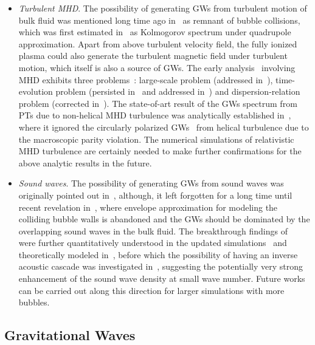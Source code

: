 \documentclass[a4paper,11pt]{article}
\begin{document}
\begin{itemize}
  \item \textit{Turbulent MHD}. The possibility of generating GWs from turbulent motion of bulk fluid was mentioned long time ago in~\cite{Witten:1984rs} as remnant of bubble collisions, which was first estimated in~\cite{Kamionkowski:1993fg} as Kolmogorov spectrum under quadrupole approximation. Apart from above turbulent velocity field, the fully ionized plasma could also generate the turbulent magnetic field under turbulent motion, which itself is also a source of GWs. The early analysis~\cite{Kosowsky:2001xp,Dolgov:2002ra} involving MHD exhibits three problems~\cite{Binetruy:2012ze}: large-scale problem (addressed in~\cite{Caprini:2006jb,Gogoberidze:2007an}), time-evolution problem (persisted in~\cite{Gogoberidze:2007an} and addressed in~\cite{Caprini:2006jb}) and dispersion-relation problem (corrected in~\cite{Caprini:2006jb,Gogoberidze:2007an}). The state-of-art result of the GWs spectrum from PTs due to non-helical MHD turbulence was analytically established in~\cite{Caprini:2009yp}, where it ignored the circularly polarized GWs~\cite{Kahniashvili:2005qi,Kahniashvili:2008er,Kahniashvili:2008pf,Kahniashvili:2008pe,Caprini:2009pr,Kahniashvili:2009qi,Kisslinger:2015hua} from helical turbulence due to the macroscopic parity violation. The numerical simulations of relativistic MHD turbulence are certainly needed to make further confirmations for the above analytic results in the future.
  \item \textit{Sound waves}. The possibility of generating GWs from sound waves was originally pointed out in~\cite{Hogan:1986qda}, although, it left forgotten for a long time until recent revelation in~\cite{Hindmarsh:2013xza}, where envelope approximation for modeling the colliding bubble walls is abandoned and the GWs should be dominated by the overlapping sound waves in the bulk fluid. The breakthrough findings of~\cite{Hindmarsh:2013xza} were further quantitatively understood in the updated simulations~\cite{Giblin:2014qia,Hindmarsh:2015qta} and theoretically modeled in~\cite{Hindmarsh:2016lnk}, before which the possibility of having an inverse acoustic cascade was investigated in~\cite{Kalaydzhyan:2014wca}, suggesting the potentially very strong enhancement of the sound wave density at small wave number. Future works can be carried out along this direction for larger simulations with more bubbles.
\end{itemize}

\subsection{Gravitational Waves}
\label{subsec:GWPT}
\end{document}
